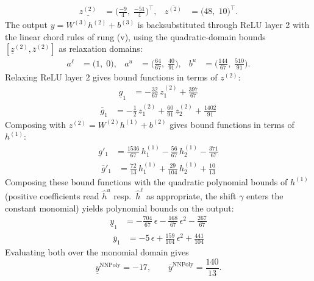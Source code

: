 \documentclass[11pt]{article}
\begin{document}
\begin{align*}
\underline{z^{(2)}} &= \bigl(\frac{-9}{4},\; \frac{-51}{4}\bigr)^{\!\top}, & \overline{z^{(2)}} &= \bigl(48,\; 10\bigr)^{\!\top}.
\end{align*}
The output $y = W^{(3)} h^{(2)} + b^{(3)}$ is backsubstituted through ReLU layer 2 with the linear chord rules of rung (v), using the quadratic-domain bounds
$[\underline{z}^{(2)}, \overline{z}^{(2)}]$ as relaxation domains:
\begin{align*}
a^{\ell} &= \bigl(1,\; 0\bigr), & a^{u} &= \bigl(\frac{64}{67},\; \frac{40}{91}\bigr), & b^{u} &= \bigl(\frac{144}{67},\; \frac{510}{91}\bigr).
\end{align*}
Relaxing ReLU layer 2 gives bound functions in terms of $z^{(2)}$:
\begin{align*}
\underline{g}_{1} &= -\frac{32}{67}\,z^{(2)}_{1} + \frac{397}{67}
\end{align*}
\begin{align*}
\overline{g}_{1} &= -\frac{1}{2}\,z^{(2)}_{1} + \frac{60}{91}\,z^{(2)}_{2} + \frac{1402}{91}
\end{align*}
Composing with $z^{(2)} = W^{(2)} h^{(1)} + b^{(2)}$ gives bound functions in terms of $h^{(1)}$:
\begin{align*}
\underline{g}'_{1} &= \frac{1536}{67}\,h^{(1)}_{1} - \frac{56}{67}\,h^{(1)}_{2} - \frac{371}{67}
\end{align*}
\begin{align*}
\overline{g}'_{1} &= \frac{72}{13}\,h^{(1)}_{1} + \frac{29}{104}\,h^{(1)}_{2} + \frac{10}{13}
\end{align*}
Composing these bound functions with the quadratic polynomial bounds of $h^{(1)}$ (positive
coefficients read $\hat{h}^{u}$ resp.\ $\hat{h}^{\ell}$ as appropriate, the shift $\gamma$ enters the
constant monomial) yields polynomial bounds on the output:
\begin{align*}
\underline{y}_{1} &= -\frac{704}{67}\,\epsilon - \frac{168}{67}\,\epsilon^2 - \frac{267}{67}
\end{align*}
\begin{align*}
\overline{y}_{1} &= -5\,\epsilon + \frac{159}{104}\,\epsilon^2 + \frac{441}{104}
\end{align*}
Evaluating both over the monomial domain gives
\begin{equation*}
\underline{y}^{\text{NNPoly}} = -17, \qquad \overline{y}^{\text{NNPoly}} = \frac{140}{13}.
\end{equation*}
\end{document}
